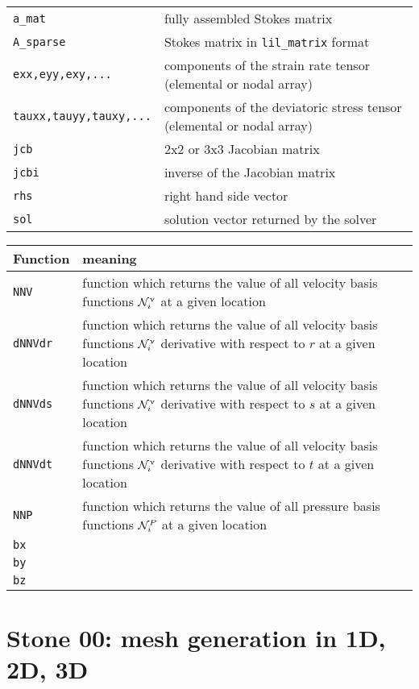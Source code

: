\begin{tabular}{p{3.5cm}p{12.5cm}}
{\tt a\_mat}  & fully assembled Stokes matrix \\
{\tt A\_sparse} & Stokes matrix in {\tt lil\_matrix} format \\
{\tt exx,eyy,exy,...} & components of the strain rate tensor (elemental or nodal array)\\
{\tt tauxx,tauyy,tauxy,...} & components of the deviatoric stress tensor (elemental or nodal array)\\
{\tt jcb} & 2x2 or 3x3 Jacobian matrix \\
{\tt jcbi} & inverse of the Jacobian matrix \\
{\tt rhs} & right hand side vector \\
{\tt sol} & solution vector returned by the solver\\
\hline
\end{tabular}

\vspace{.5cm}

\begin{tabular}{p{2cm}p{14cm}}
\hline
Function & meaning \\
\hline
{\tt NNV}    & function which returns the value of all velocity basis functions 
               ${\cal N}_i^\upnu$ at a given location\\
{\tt dNNVdr} & function which returns the value of all velocity basis functions 
               ${\cal N}_i^\upnu$ derivative with respect to $r$ at a given location\\
{\tt dNNVds} & function which returns the value of all velocity basis functions 
               ${\cal N}_i^\upnu$ derivative with respect to $s$ at a given location\\
{\tt dNNVdt} & function which returns the value of all velocity basis functions 
               ${\cal N}_i^\upnu$ derivative with respect to $t$ at a given location\\
{\tt NNP}    & function which returns the value of all pressure basis functions 
               ${\cal N}_i^P$ at a given location\\
{\tt bx} & \\
{\tt by} & \\
{\tt bz} & \\
\hline
\end{tabular}



\newpage %
\section*{
Stone 00: mesh generation in 1D, 2D, 3D 
\label{f00}}

